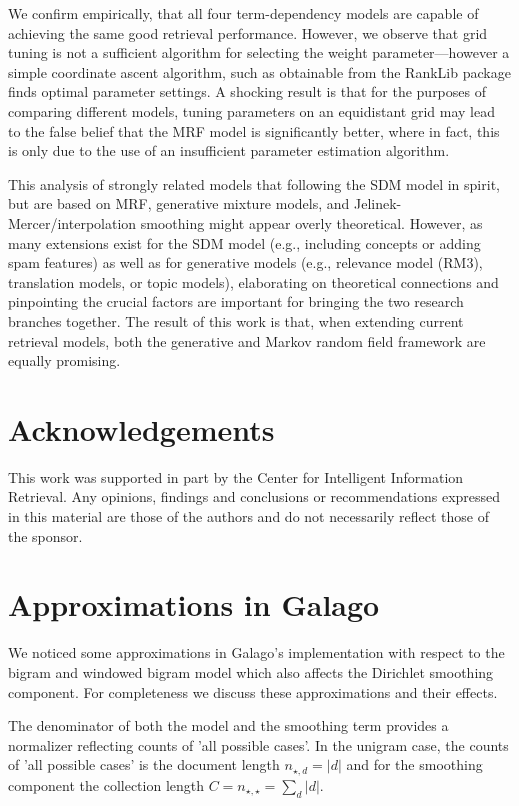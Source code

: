 \documentclass[]{article}
\begin{document}
We confirm empirically, that all four term-dependency models are capable
of achieving the same good retrieval performance. However, we observe
that grid tuning is not a sufficient algorithm for selecting the weight
parameter---however a simple coordinate ascent algorithm, such as
obtainable from the RankLib package finds optimal parameter settings. 
A shocking result is that for the purposes of comparing different models, 
tuning parameters on an equidistant grid may lead to the false belief that the MRF model is significantly better, where in fact, this is only due to the use of an insufficient parameter estimation algorithm.

This analysis of strongly related models that following the SDM model
in spirit, but are based on MRF, generative mixture models, and Jelinek-Mercer/interpolation
smoothing might appear overly theoretical. However, as many extensions
exist for the SDM model (e.g., including concepts or adding spam features)
as well as for generative models (e.g., relevance model (RM3), translation
models, or topic models), elaborating on theoretical connections and
pinpointing the crucial factors are important for bringing the two
research branches together. The result of this work is that, when
extending current retrieval models, both the generative and Markov
random field framework are equally promising.


\section*{Acknowledgements}
\small{This work was supported in part by the Center for Intelligent Information Retrieval. Any opinions, findings and conclusions or recommendations expressed in this material are those of the authors and do not necessarily reflect those of the sponsor.}





\appendix 
\section{Approximations in Galago}

We noticed some approximations in Galago's implementation with respect
to the bigram and windowed bigram model which also affects the Dirichlet
smoothing component. For completeness we discuss
these approximations and their effects.

The denominator of both the model and the smoothing term provides
a normalizer reflecting counts of 'all possible cases'. In the unigram case, the counts of 'all possible cases' is the
document length $n_{\star,d}=|d|$ and for the smoothing component
the collection length $C=n_{\star,\star}=\sum_{d}|d|$.
\end{document}
